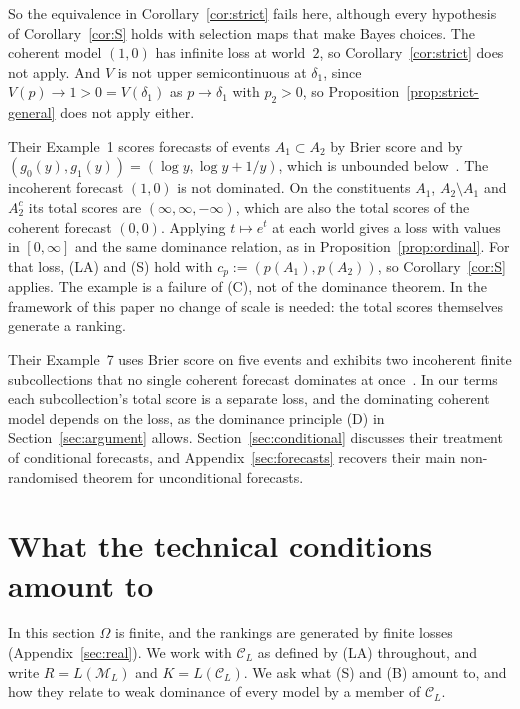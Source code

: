 \documentclass[11pt]{article}
\theoremstyle{definition}
\theoremstyle{remark}
\newcommand{\M}{\mathcal M}
\newcommand{\C}{\mathcal C}
\begin{document}
So the equivalence in Corollary~\ref{cor:strict} fails here, although every hypothesis of Corollary~\ref{cor:S} holds with selection maps that make Bayes choices. The coherent model $(1,0)$ has infinite loss at world~$2$, so Corollary~\ref{cor:strict} does not apply. And $V$ is not upper semicontinuous at $\delta_1$, since $V(p)\to1>0=V(\delta_1)$ as $p\to\delta_1$ with $p_2>0$, so Proposition~\ref{prop:strict-general} does not apply either.

Their Example~1 scores forecasts of events $A_1\subset A_2$ by Brier score and by $(g_0(y),g_1(y))=(\log y,\log y+1/y)$, which is unbounded below~\cite[Example~1]{SSK09}. The incoherent forecast $(1,0)$ is not dominated. On the constituents $A_1$, $A_2\setminus A_1$ and $A_2^c$ its total scores are $(\infty,\infty,-\infty)$, which are also the total scores of the coherent forecast $(0,0)$. Applying $t\mapsto e^t$ at each world gives a loss with values in $[0,\infty]$ and the same dominance relation, as in Proposition~\ref{prop:ordinal}. For that loss, (LA) and (S) hold with $c_p:=(p(A_1),p(A_2))$, so Corollary~\ref{cor:S} applies. The example is a failure of (C), not of the dominance theorem. In the framework of this paper no change of scale is needed: the total scores themselves generate a ranking.

Their Example~7 uses Brier score on five events and exhibits two incoherent finite subcollections that no single coherent forecast dominates at once~\cite[Example~7]{SSK09}. In our terms each subcollection's total score is a separate loss, and the dominating coherent model depends on the loss, as the dominance principle (D) in Section~\ref{sec:argument} allows. Section~\ref{sec:conditional} discusses their treatment of conditional forecasts, and Appendix~\ref{sec:forecasts} recovers their main non-randomised theorem for unconditional forecasts.


\section{What the technical conditions amount to}\label{sec:finite}
In this section $\Omega$ is finite, and the rankings are generated by finite losses (Appendix~\ref{sec:real}). We work with $\C_L$ as defined by (LA) throughout, and write $R=L(\M_L)$ and $K=L(\C_L)$. We ask what (S) and (B) amount to, and how they relate to weak dominance of every model by a member of $\C_L$.
\end{document}
